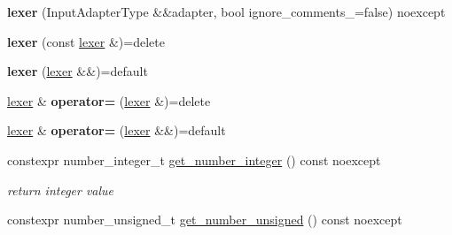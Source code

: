 \begin{DoxyCompactItemize}
\item 
\mbox{\label{classnlohmann_1_1detail_1_1lexer_a89bbc051da2514a469441a3a30ad63e4}} 
{\bfseries lexer} (Input\+Adapter\+Type \&\&adapter, bool ignore\+\_\+comments\+\_\+=false) noexcept
\item 
\mbox{\label{classnlohmann_1_1detail_1_1lexer_ab75d61c4de687717648c7698850ddb9b}} 
{\bfseries lexer} (const \hyperlink{classnlohmann_1_1detail_1_1lexer}{lexer} \&)=delete
\item 
\mbox{\label{classnlohmann_1_1detail_1_1lexer_ae95416c7ae8b36f0dd0ab349eaa754a2}} 
{\bfseries lexer} (\hyperlink{classnlohmann_1_1detail_1_1lexer}{lexer} \&\&)=default
\item 
\mbox{\label{classnlohmann_1_1detail_1_1lexer_af7e7002d4bb66e9104d752791b8070f8}} 
\hyperlink{classnlohmann_1_1detail_1_1lexer}{lexer} \& {\bfseries operator=} (\hyperlink{classnlohmann_1_1detail_1_1lexer}{lexer} \&)=delete
\item 
\mbox{\label{classnlohmann_1_1detail_1_1lexer_a1383bb59c5efd4f9370ca3ee4ad1a4ba}} 
\hyperlink{classnlohmann_1_1detail_1_1lexer}{lexer} \& {\bfseries operator=} (\hyperlink{classnlohmann_1_1detail_1_1lexer}{lexer} \&\&)=default
\item 
\mbox{\label{classnlohmann_1_1detail_1_1lexer_a9535d0c72adbe9fe149853ebad5faee8}} 
constexpr number\+\_\+integer\+\_\+t \hyperlink{classnlohmann_1_1detail_1_1lexer_a9535d0c72adbe9fe149853ebad5faee8}{get\+\_\+number\+\_\+integer} () const noexcept
\begin{DoxyCompactList}\small\item\em return integer value \end{DoxyCompactList}\item 
\mbox{\label{classnlohmann_1_1detail_1_1lexer_abfc85ff04fcb1a5a8d8ea299a4c479e5}} 
constexpr number\+\_\+unsigned\+\_\+t \hyperlink{classnlohmann_1_1detail_1_1lexer_abfc85ff04fcb1a5a8d8ea299a4c479e5}{get\+\_\+number\+\_\+unsigned} () const noexcept

\end{DoxyCompactItemize}
